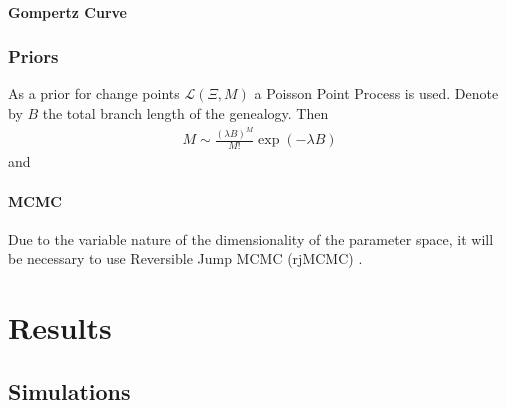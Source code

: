 \documentclass{report}
\theoremstyle{definition}
\begin{document}
\subsubsection{Gompertz Curve}
\subsection{Priors}
As a prior for change points $\mathcal{L}(\Xi,M)$ a Poisson Point Process is used. Denote by $B$ the total branch length of the genealogy. Then
\begin{gather}
M\sim\frac{(\lambda B)^M}{M!}\exp(-\lambda B)
\end{gather}
and 
\subsubsection{MCMC}
Due to the variable nature of the dimensionality of the parameter space, it will be necessary to use Reversible Jump MCMC (rjMCMC) \cite{fan_reversible_2010,green_reversible_1995}.
\chapter{Results}
\section{Simulations}
\end{document}

